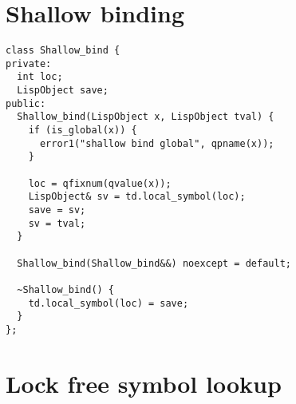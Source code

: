 \section{Shallow binding}
\label{sec:shallowbind-code}

\begin{code}
\begin{verbatim}
class Shallow_bind {
private:
  int loc;
  LispObject save;
public:
  Shallow_bind(LispObject x, LispObject tval) {
    if (is_global(x)) {
      error1("shallow bind global", qpname(x));
    }

    loc = qfixnum(qvalue(x));
    LispObject& sv = td.local_symbol(loc);
    save = sv;
    sv = tval;
  }

  Shallow_bind(Shallow_bind&&) noexcept = default;

  ~Shallow_bind() {
    td.local_symbol(loc) = save;
  }
};
\end{verbatim}
\end{code}

\section{Lock free symbol lookup}
\label{sec:lockfree-code}

